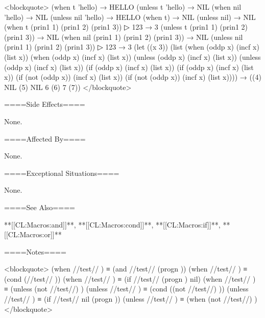 <blockquote> (when t 'hello) → HELLO (unless t 'hello) → NIL (when nil 'hello) → NIL (unless nil 'hello) → HELLO (when t) → NIL (unless nil) → NIL (when t (prin1 1) (prin1 2) (prin1 3))
▷ 123 → 3 (unless t (prin1 1) (prin1 2) (prin1 3)) → NIL (when nil (prin1 1) (prin1 2) (prin1 3)) → NIL (unless nil (prin1 1) (prin1 2) (prin1 3))
▷ 123 → 3 (let ((x 3)) (list (when (oddp x) (incf x) (list x)) (when (oddp x) (incf x) (list x)) (unless (oddp x) (incf x) (list x)) (unless (oddp x) (incf x) (list x)) (if (oddp x) (incf x) (list x)) (if (oddp x) (incf x) (list x)) (if (not (oddp x)) (incf x) (list x)) (if (not (oddp x)) (incf x) (list x)))) → ((4) NIL (5) NIL 6 (6) 7 (7)) </blockquote>

====Side Effects====

None.

====Affected By====

None.

====Exceptional Situations====

None.

====See Also====

**[[CL:Macros:and]]**, **[[CL:Macros:cond]]**, **[[CL:Macros:if]]**, **[[CL:Macros:or]]**

====Notes====

<blockquote> (when //test// ) ≡ (and //test// (progn )) (when //test// ) ≡ (cond (//test// )) (when //test// ) ≡ (if //test// (progn ) nil) (when //test// ) ≡ (unless (not //test//) ) (unless //test// ) ≡ (cond ((not //test//) )) (unless //test// ) ≡ (if //test// nil (progn )) (unless //test// ) ≡ (when (not //test//) ) </blockquote>

